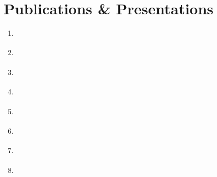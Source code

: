 \normalsize
\section{Publications \& Presentations}
\begin{enumerate}

	\item {} \label{ans_2017} \vspace{4mm}
	\item {} \label{ans_2013} \vspace{4mm}
	\item {} \label{aries} \vspace{4mm}
	\item {} \label{fy12} \vspace{4mm}
	\item {} \label{mcnp6_um} \vspace{4mm}
	\item {} \label{mst1} \vspace{4mm}
	\item {} \label{mst2} \vspace{4mm}
	\item {} \label{nair} \vspace{4mm}
	
\end{enumerate}



